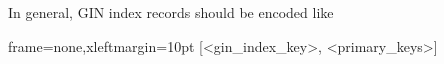 In general, GIN index records should be encoded like

\begin{textcode*}{frame=none,xleftmargin=10pt}
[<gin_index_key>, <primary_keys>]
\end{textcode*}
